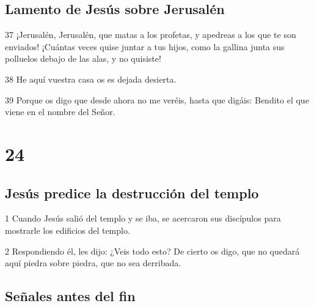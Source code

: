 \section*{Lamento de Jesús sobre Jerusalén}

\par 37 ¡Jerusalén, Jerusalén, que matas a los profetas, y apedreas a los que te son enviados! ¡Cuántas veces quise juntar a tus hijos, como la gallina junta sus polluelos debajo de las alas, y no quisiste!
\par 38 He aquí vuestra casa os es dejada desierta.
\par 39 Porque os digo que desde ahora no me veréis, hasta que digáis: Bendito el que viene en el nombre del Señor.

\chapter{24}

\section*{Jesús predice la destrucción del templo}

\par 1 Cuando Jesús salió del templo y se iba, se acercaron sus discípulos para mostrarle los edificios del templo.
\par 2 Respondiendo él, les dijo: ¿Veis todo esto? De cierto os digo, que no quedará aquí piedra sobre piedra, que no sea derribada.

\section*{Señales antes del fin}

